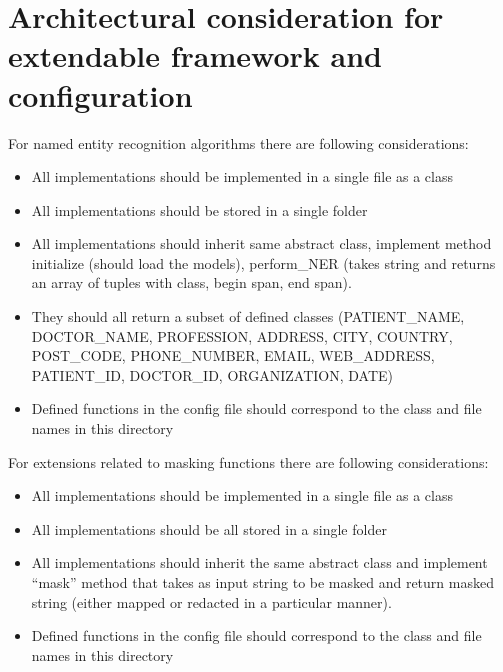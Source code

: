 \documentclass[letterpaper,10pt,english]{sphinxmanual}
\begin{document}
\section{Architectural consideration for extendable framework and configuration}
\label{\detokenize{contents:architectural-consideration-for-extendable-framework-and-configuration}}
For named entity recognition algorithms there are following considerations:
\begin{itemize}
\item {} 
All implementations should be implemented in a single file as a class

\item {} 
All implementations should be stored in a single folder

\item {} 
All implementations should inherit same abstract class, implement method initialize (should load the models), perform\_NER (takes string and returns an array of tuples with class, begin span, end span).

\item {} 
They should all return a subset of defined classes (PATIENT\_NAME, DOCTOR\_NAME, PROFESSION, ADDRESS, CITY, COUNTRY, POST\_CODE, PHONE\_NUMBER, EMAIL, WEB\_ADDRESS, PATIENT\_ID, DOCTOR\_ID, ORGANIZATION, DATE)

\item {} 
Defined functions in the config file should correspond to the class and file names in this directory

\end{itemize}

For extensions related to masking functions there are following considerations:
\begin{itemize}
\item {} 
All implementations should be implemented in a single file as a class

\item {} 
All implementations should be all stored in a single folder

\item {} 
All implementations should inherit the same abstract class and implement “mask” method that takes as input string to be masked and return masked string (either mapped or redacted in a particular manner).

\item {} 
Defined functions in the config file should correspond to the class and file names in this directory

\end{itemize}
\end{document}
